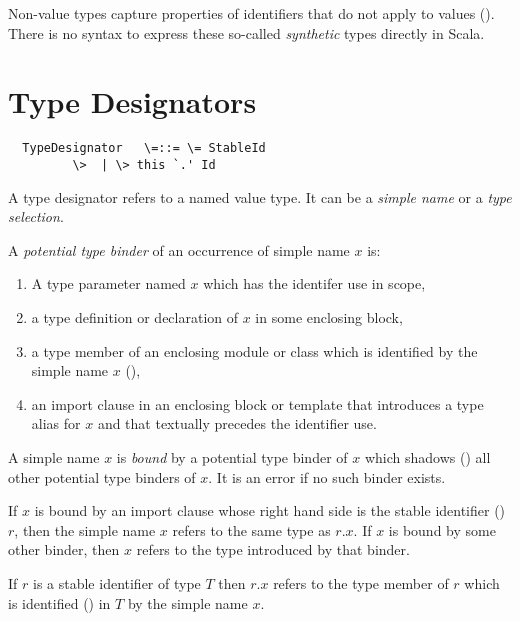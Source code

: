 \documentclass[11pt]{report}
\begin{document}
Non-value types capture properties of
identifiers that do not apply to values
().  There is no syntax to express these
so-called {\em synthetic} types directly in Scala.

\section{Type Designators}
\label{sec:type-desig}

\syntax\begin{verbatim}
  TypeDesignator   \=::= \= StableId
		 \>  | \> this `.' Id
\end{verbatim}

A type designator refers to a named value type. It can be a {\em simple
name} or a {\em type selection}.

A {\em potential type binder} of an occurrence of simple name $x$ is:
\begin{enumerate}
\item A type parameter named $x$ which has the identifer use in scope,
\item a type definition or declaration of $x$ in some enclosing block,
\item a type member of an enclosing module or class which is identified
      by the simple name $x$ (),
\item an import clause in an enclosing block or template that introduces
      a type alias for $x$ and that textually precedes the identifier use.
\end{enumerate}
A simple name $x$ is {\em bound} by a
potential type binder of $x$ which shadows () all
other potential type binders of $x$.  It is an error if no such binder
exists.

If $x$ is bound by an import clause whose right hand side is the
stable identifier () $r$, then the simple name $x$
refers to the same type as $r.x$. If $x$ is bound by some other
binder, then $x$ refers to the type introduced by that binder.


If $r$ is a stable identifier of type $T$ then $r.x$ refers to the
type member of $r$ which is identified () in $T$ by
the simple name $x$.

%
\end{document}
